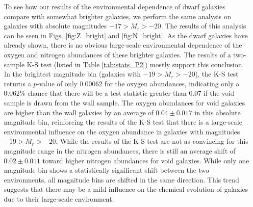 To see how our results of the environmental dependence of dwarf galaxies compare 
with somewhat brighter galaxies, we perform the same analysis on galaxies with 
absolute magnitudes $-17 > M_r > -20$.  The results of this analysis can be seen 
in Figs. \ref{fig:Z_bright} and \ref{fig:N_bright}.  As the dwarf galaxies have 
already shown, there is no obvious large-scale environmental dependence of the 
oxygen and nitrogen abundances of these brighter galaxies.  The results of a 
two-sample K-S test (listed in Table \ref{tab:stats_P2}) mostly support this 
conclusion.  In the brightest magnitude bin (galaxies with $-19 > M_r > -20$), 
the K-S test returns a $p$-value of only 0.00062 for the oxygen abundances, 
indicating only a 0.062\% chance that there will be a test statistic greater 
than 0.07 if the void sample is drawn from the wall sample.  The oxygen 
abundances for void galaxies are higher than the wall galaxies by an average of 
$0.04\pm 0.017$ in this absolute magnitude bin, reinforcing the results of the 
K-S test that there is a large-scale environmental influence on the oxygen 
abundance in galaxies with magnitudes $-19 > M_r > -20$.  While the results of 
the K-S test are not as convincing for this magnitude range in the nitrogen 
abundances, there is still an average shift of $0.02\pm 0.011$ toward higher 
nitrogen abundances for void galaxies.  While only one magnitude bin shows a 
statistically significant shift between the two environments, all magnitude bins 
are shifted in the same direction.  This trend suggests that there may be a mild 
influence on the chemical evolution of galaxies due to their large-scale 
environment.

